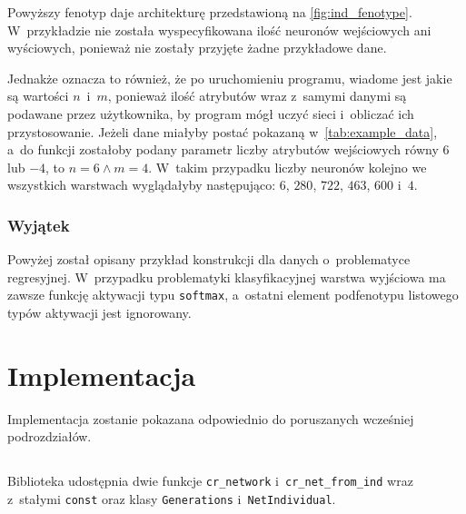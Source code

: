 Powyższy fenotyp daje architekturę
przedstawioną na \cref{fig:ind_fenotype}.
W~przykładzie nie została wyspecyfikowana
ilość neuronów wejściowych ani wyściowych,
ponieważ nie zostały przyjęte żadne przykładowe dane.

\begin{table}
  \centering
  
  \caption{
    Przykładowe dane, gdzie atrybuty wejściowe
    i~wyjściowe znajdują się w~jednej tabeli.
    Pierwszych jest 6 i~mają następujące nazwy:
    $x_1$, $x_2$, $x_3$, $x_4$, $x_5$ oraz $x_6$.
    A~4 atrybuty wyjściowe to:
    $y_1$, $y_2$, $y_3$ oraz $y_4$.
  }
  \label{tab:example_data}
\end{table}

Jednakże oznacza to również, że po uruchomieniu programu,
wiadome jest jakie są wartości $n$~i~$m$,
ponieważ ilość atrybutów wraz z~samymi
danymi są podawane przez użytkownika,
by program mógł uczyć sieci
i~obliczać ich przystosowanie.
Jeżeli dane miałyby postać
pokazaną w~\cref{tab:example_data},
a~do funkcji zostałoby podany parametr
liczby atrybutów wejściowych równy
$6$ lub $-4$, to $n=6 \land m=4$.
W~takim przypadku liczby neuronów kolejno
we wszystkich warstwach wyglądałyby następująco:
$6$, $280$, $722$, $463$, $600$ i~$4$.

\subsubsection*{Wyjątek}
Powyżej został opisany przykład konstrukcji
dla danych o~problematyce regresyjnej.
W~przypadku problematyki klasyfikacyjnej
warstwa wyjściowa ma zawsze funkcję
aktywacji typu \texttt{softmax},
a~ostatni element podfenotypu listowego
typów aktywacji jest ignorowany.

\section{Implementacja}
\label{sec:implementation}
Implementacja zostanie pokazana odpowiednio
do poruszanych wcześniej podrozdziałów.

\subsection{%
}
Biblioteka udostępnia dwie funkcje \texttt{cr\_network}
i~\texttt{cr\_net\_from\_ind} wraz z~stałymi
\texttt{const} oraz klasy \texttt{Generations}
i~\texttt{NetIndividual}.
\inputminted[firstline=4]{python}{\codedir/__init__.py}

